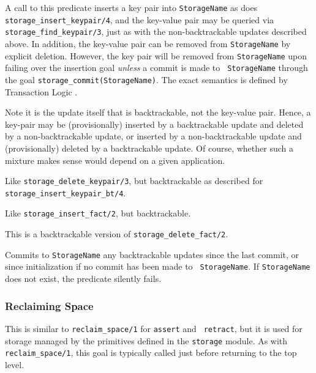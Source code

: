 \begin{description}
A call to this predicate inserts a key pair into {\tt StorageName} as
does {\tt storage\_insert\_keypair/4}, and the key-value pair may be
queried via {\tt storage\_find\_keypair/3}, just as with the
non-backtrackable updates described above.  In addition, the key-value
pair can be removed from {\tt StorageName} by explicit deletion.
However, the key pair will be removed from {\tt StorageName} upon
failing over the insertion goal {\em unless} a commit is made to {\tt
  StorageName} through the goal {\tt storage\_commit(StorageName)}.
The exact semantics is defined by Transaction Logic \cite{BoKi94}.

Note it is the update itself that is backtrackable, not the key-value
pair.  Hence, a key-pair may be (provisionally) inserted by a
backtrackable update and deleted by a non-backtrackable update, or
inserted by a non-backtrackable update and (provisionally) deleted by
a backtrackable update.  Of course, whether such a mixture makes sense
would depend on a given application.

Like {\tt storage\_delete\_keypair/3}, but backtrackable as described
for {\tt storage\_insert\_keypair\_bt/4}.

 
Like {\tt storage\_insert\_fact/2}, but backtrackable.

This is a backtrackable version of {\tt storage\_delete\_fact/2}.

 
Commits to {\tt StorageName} any backtrackable updates since the last
commit, or since initialization if no commit has been made to {\tt
  StorageName}.  If {\tt StorageName} does not exist, the predicate
silently fails.
\end{description}
\subsubsection{Reclaiming Space}
\begin{description}
 
This is similar to {\tt reclaim\_space/1} for {\tt assert} and {\tt
  retract}, but it is used for storage managed by the primitives defined in
the {\tt storage} module. As with {\tt reclaim\_space/1}, this goal is
typically called just before returning to the top level.
\end{description}



